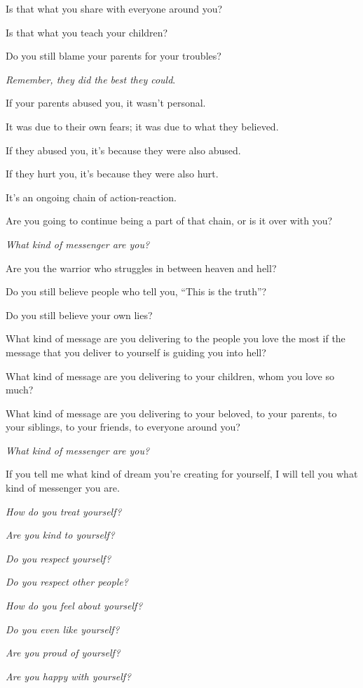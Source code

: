 \documentclass{article}
\numberwithin{equation}{section}
\begin{document}
Is that what you share with everyone around you?

Is that what you teach your children?

Do you still blame your parents for your troubles?

\textit{Remember, they did the best they could}.

If your parents abused you, it wasn't personal.

It was due to their own fears; it was due to what they believed.

If they abused you, it's because they were also abused.

If they hurt you, it's because they were also hurt.

It's an ongoing chain of action-reaction.

Are you going to continue being a part of that chain, or is it over with you?

%
\textit{What kind of messenger are you?}

Are you the warrior who struggles in between heaven and hell?

Do you still believe people who tell you, ``This is the truth''?

Do you still believe your own lies?

What kind of message are you delivering to the people you love the most if the message that you deliver to yourself is guiding you into hell?

What kind of message are you delivering to your children, whom you love so much?

What kind of message are you delivering to your beloved, to your parents, to your siblings, to your friends, to everyone around you?

%
\textit{What kind of messenger are you?}

If you tell me what kind of dream you're creating for yourself, I will tell you what kind of messenger you are.

\textit{How do you treat yourself?}

\textit{Are you kind to yourself?}

\textit{Do you respect yourself?}

\textit{Do you respect other people?}

\textit{How do you feel about yourself?}

\textit{Do you even like yourself?}

\textit{Are you proud of yourself?}

\textit{Are you happy with yourself?}
\end{document}
